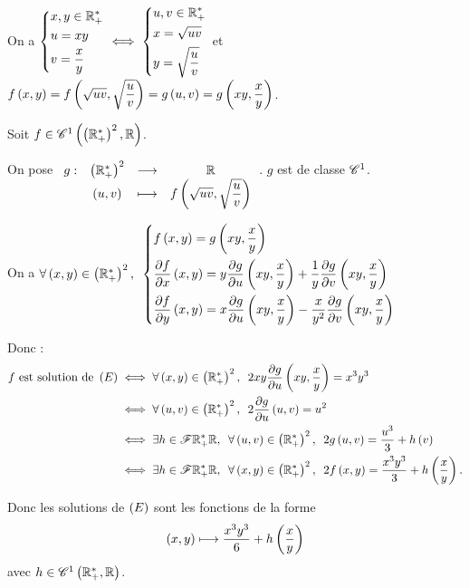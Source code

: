 \begin{ex}~\\
\begin{brouill}~\\
On a \(\begin{dcases}
x,y\in\mathbb{R}_+^* \\
u=xy \\
v=\dfrac{x}{y}
\end{dcases}\iff\begin{dcases}
u,v\in\mathbb{R}_+^* \\
x=\sqrt{uv} \\
y=\sqrt{\dfrac{u}{v}}
\end{dcases}\) et \(f\left(x,y\right)=f\left(\sqrt{uv},\sqrt{\dfrac{u}{v}}\right)=g\left(u,v\right)=g\left(xy,\dfrac{x}{y}\right)\).
\end{brouill}

Soit \(f\in\mathscr{C}^{1}\left(\left(\mathbb{R}_+^*\right)^2,\mathbb{R}\right)\).

On pose \(\begin{array}[t]{cccc}g : & \left(\mathbb{R}_+^*\right)^2 & \longrightarrow & \mathbb{R} \\ & \left(u,v\right) & \longmapsto & f\left(\sqrt{uv},\sqrt{\dfrac{u}{v}}\right)\end{array}\). \(g\) est de classe \(\mathscr{C}^{1}\).

On a \(\quantifs{\forall\paren{x,y}\in\paren{\Rps}^2}\begin{dcases}
f\paren{x,y}=g\paren{xy,\dfrac{x}{y}} \\
\pdv{f}{x}\paren{x,y}=y\pdv{g}{u}\paren{xy,\dfrac{x}{y}}+\dfrac{1}{y}\pdv{g}{v}\paren{xy,\dfrac{x}{y}} \\
\pdv{f}{y}\paren{x,y}=x\pdv{g}{u}\paren{xy,\dfrac{x}{y}}-\dfrac{x}{y^2}\pdv{g}{v}\paren{xy,\dfrac{x}{y}}
\end{dcases}\)

Donc : \[\begin{aligned}
f\text{ est solution de }\paren{E}&\ssi\quantifs{\forall\paren{x,y}\in\paren{\Rps}^2}2xy\pdv{g}{u}\paren{xy,\dfrac{x}{y}}=x^3y^3 \\
&\ssi\quantifs{\forall\paren{u,v}\in\paren{\Rps}^2}2\pdv{g}{u}\paren{u,v}=u^2 \\
&\ssi\quantifs{\exists h\in\F{\Rps}{\R};\forall\paren{u,v}\in\paren{\Rps}^2}2g\paren{u,v}=\dfrac{u^3}{3}+h\paren{v} \\
&\ssi\quantifs{\exists h\in\F{\Rps}{\R};\forall\paren{x,y}\in\paren{\Rps}^2}2f\paren{x,y}=\dfrac{x^3y^3}{3}+h\paren{\dfrac{x}{y}}.
\end{aligned}\]

Donc les solutions de \(\left(E\right)\) sont les fonctions de la forme \[\left(x,y\right)\longmapsto\dfrac{x^3y^3}{6}+h\left(\dfrac{x}{y}\right)\] avec \(h\in\mathscr{C}^{1}\left(\mathbb{R}_+^*,\mathbb{R}\right)\).
\end{ex}

